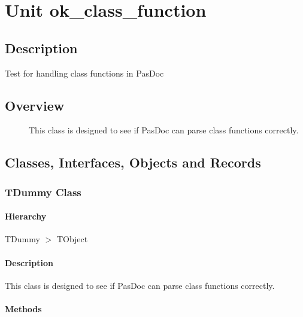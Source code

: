 \documentclass{report}
\newif\ifpdf
\begin{document}
\label{toc}\tableofcontents
\newpage
\newlength{\tmplength}
\chapter{Unit ok{\_}class{\_}function}
\label{ok_class_function}
\section{Description}
Test for handling class functions in PasDoc
\section{Overview}
\begin{description}
\item[\texttt{\begin{ttfamily}TDummy\end{ttfamily} Class}]This class is designed to see if PasDoc can parse class functions correctly.
\end{description}
\section{Classes, Interfaces, Objects and Records}
\ifpdf
\subsection*{\large{\textbf{TDummy Class}}\normalsize\hspace{1ex}\hrulefill}
\else
\subsection*{TDummy Class}
\fi
\label{ok_class_function.TDummy}
\subsubsection*{\large{\textbf{Hierarchy}}\normalsize\hspace{1ex}\hfill}
TDummy {$>$} TObject
\subsubsection*{\large{\textbf{Description}}\normalsize\hspace{1ex}\hfill}
This class is designed to see if PasDoc can parse class functions correctly.\subsubsection*{\large{\textbf{Methods}}\normalsize\hspace{1ex}\hfill}
\end{document}
